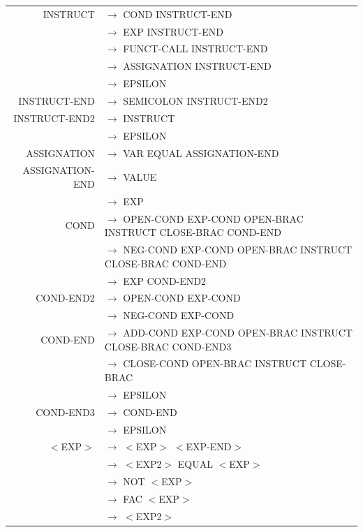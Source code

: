 \documentclass[a4paper,10pt]{article}
\begin{document}
\hspace{-3.5cm}\begin{tabular}{rl}
INSTRUCT			& $\rightarrow$ COND INSTRUCT-END \\					
					& $\rightarrow$ EXP INSTRUCT-END \\					
					& $\rightarrow$ FUNCT-CALL INSTRUCT-END \\					
					& $\rightarrow$ ASSIGNATION INSTRUCT-END \\
					& $\rightarrow$ EPSILON \\

INSTRUCT-END		& $\rightarrow$ SEMICOLON INSTRUCT-END2\\

INSTRUCT-END2		& $\rightarrow$ INSTRUCT\\
					& $\rightarrow$ EPSILON \\
					

ASSIGNATION			& $\rightarrow$ VAR EQUAL ASSIGNATION-END \\

ASSIGNATION-END		& $\rightarrow$ VALUE \\
					& $\rightarrow$ EXP \\
					
COND				& $\rightarrow$ OPEN-COND EXP-COND OPEN-BRAC INSTRUCT CLOSE-BRAC COND-END\\
					& $\rightarrow$ NEG-COND EXP-COND OPEN-BRAC INSTRUCT CLOSE-BRAC COND-END\\
					& $\rightarrow$ EXP COND-END2 \\

COND-END2			& $\rightarrow$ OPEN-COND EXP-COND \\
					& $\rightarrow$ NEG-COND EXP-COND \\


COND-END			& $\rightarrow$ ADD-COND EXP-COND OPEN-BRAC INSTRUCT CLOSE-BRAC COND-END3 \\
					& $\rightarrow$ CLOSE-COND OPEN-BRAC INSTRUCT CLOSE-BRAC\\
					& $\rightarrow$ EPSILON \\	
					
COND-END3			& $\rightarrow$ COND-END \\
					& $\rightarrow$ EPSILON \\					

$<$EXP$>$			& $\rightarrow$ $<$EXP$>$ $<$EXP-END$>$\\
					& $\rightarrow$ $<$EXP2$>$ EQUAL $<$EXP$>$\\
					& $\rightarrow$ NOT $<$EXP$>$ \\
					& $\rightarrow$ FAC $<$EXP$>$ \\
					& $\rightarrow$ $<$EXP2$>$ \\
					

\end{tabular}
\end{document}
